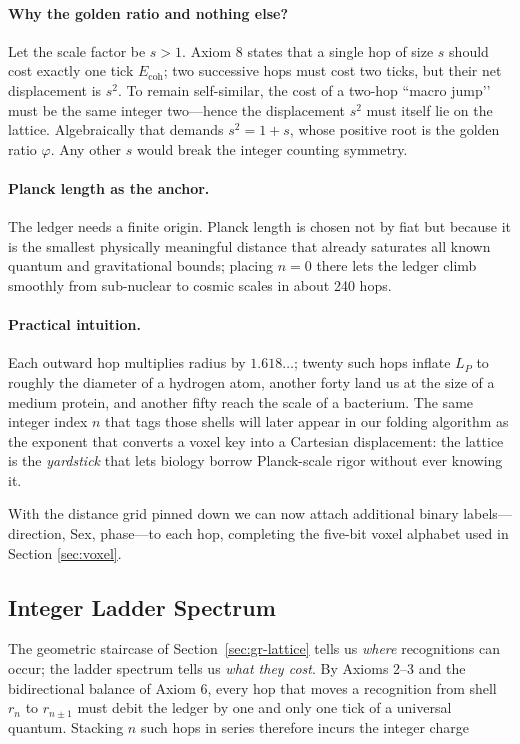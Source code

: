 \documentclass[11pt]{article}
\newcommand{\phiGR}{\varphi}                 %
\newcommand{\LP}{L_{\!P}}                    %
\newcommand{\Eoh}{E_{\mathrm{coh}}}          %
\begin{document}
\paragraph{Why the golden ratio and nothing else?}
Let the scale factor be \(s>1\).  Axiom 8 states that a single hop of
size \(s\) should cost exactly one tick \(\Eoh\); two successive hops
must cost two ticks, but their net displacement is \(s^{2}\).  To remain
self-similar, the cost of a two-hop “macro jump’’ must be the same
integer two—hence the displacement \(s^{2}\) must itself lie on the
lattice.  Algebraically that demands \(s^{2}=1+s\), whose positive root
is the golden ratio \(\phiGR\).  Any other \(s\) would break the integer
counting symmetry.

\paragraph{Planck length as the anchor.}
The ledger needs a finite origin.  Planck length is chosen not by fiat
but because it is the smallest physically meaningful distance that
already saturates all known quantum and gravitational bounds; placing
\(n=0\) there lets the ledger climb smoothly from sub-nuclear to cosmic
scales in about 240 hops.

\paragraph{Practical intuition.}
Each outward hop multiplies radius by \(1.618\ldots\); twenty such hops
inflate \(\LP\) to roughly the diameter of a hydrogen atom, another
forty land us at the size of a medium protein, and another fifty reach
the scale of a bacterium.  The same integer index \(n\) that tags those
shells will later appear in our folding algorithm as the exponent that
converts a voxel key into a Cartesian displacement: the lattice is the
\emph{yardstick} that lets biology borrow Planck-scale rigor without
ever knowing it.

With the distance grid pinned down we can now attach additional binary
labels—direction, Sex, phase—to each hop, completing the five-bit voxel
alphabet used in Section \ref{sec:voxel}.

\subsection{Integer Ladder Spectrum}\label{sec:int-ladder}

The geometric staircase of Section~\ref{sec:gr-lattice} tells us \emph{where}
recognitions can occur; the ladder spectrum tells us \emph{what they cost}.
By Axioms 2–3 and the bidirectional balance of Axiom 6, every hop that
moves a recognition from shell \(r_{n}\) to \(r_{n\pm1}\) must debit the
ledger by one and only one tick of a universal quantum.  Stacking \(n\)
such hops in series therefore incurs the integer charge
\end{document}
